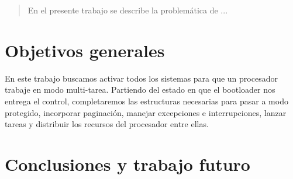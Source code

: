 \documentclass[a4paper]{article}
\begin{document}
\thispagestyle{empty}

\maketitle
\newpage

\thispagestyle{empty}
\vfill
\begin{abstract}
En el presente trabajo se describe la problemática de ...
\end{abstract}

\thispagestyle{empty}
\vspace{3cm}
\tableofcontents
\newpage


\newpage

\section{Objetivos generales}

En este trabajo buscamos activar todos los sistemas para que un procesador trabaje en modo multi-tarea. Partiendo del estado en que el bootloader nos entrega el control, completaremos las estructuras necesarias para pasar a modo protegido, incorporar paginación, manejar excepciones e interrupciones, lanzar tareas y distribuir los recursos del procesador entre ellas.




\section{Conclusiones y trabajo futuro}
\end{document}
